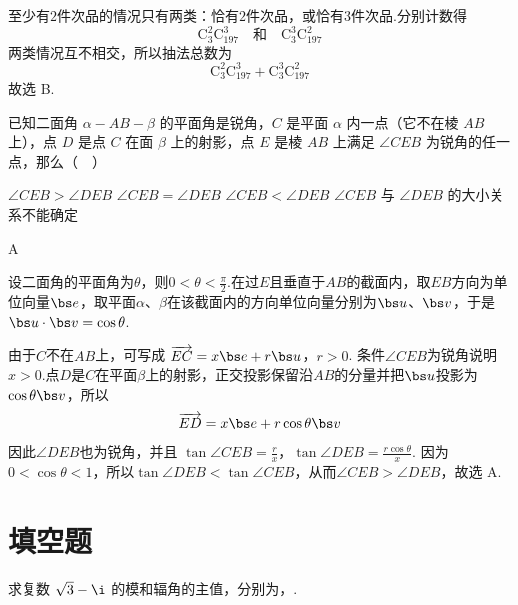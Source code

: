 \begin{solution}
至少有\(2\)件次品的情况只有两类：恰有\(2\)件次品，或恰有\(3\)件次品.分别计数得
\[
\mathrm C_3^2\mathrm C_{197}^3
\quad\text{和}\quad
\mathrm C_3^3\mathrm C_{197}^2
\]
两类情况互不相交，所以抽法总数为
\[
\mathrm C_3^2\mathrm C_{197}^3+\mathrm C_3^3\mathrm C_{197}^2
\]
故选 B.
\end{solution}

\begin{problem}

已知二面角 \(\alpha-AB-\beta\) 的平面角是锐角，\(C\) 是平面 \(\alpha\) 内一点（它不在棱 \(AB\) 上），点 \(D\) 是点 \(C\) 在面 \(\beta\) 上的射影，点 \(E\) 是棱 \(AB\) 上满足 \(\angle CEB\) 为锐角的任一点，那么（\(\quad\)）

\choices
    {\(\angle CEB > \angle DEB\)}
    {\(\angle CEB = \angle DEB\)}
    {\(\angle CEB < \angle DEB\)}
    {\(\angle CEB\) 与 \(\angle DEB\) 的大小关系不能确定}
\end{problem}

\begin{answer}
A
\end{answer}

\begin{solution}
设二面角的平面角为\(\theta\)，则\(0<\theta<\frac{\pi}{2}\).在过\(E\)且垂直于\(AB\)的截面内，取\(EB\)方向为单位向量\(\bs e\)，取平面\(\alpha\)、\(\beta\)在该截面内的方向单位向量分别为\(\bs u\)、\(\bs v\)，于是\(\bs u\cdot\bs v=\cos\theta\).

由于\(C\)不在\(AB\)上，可写成
\(\overrightarrow{EC}=x\bs e+r\bs u\)，\(r>0\).
条件\(\angle CEB\)为锐角说明\(x>0\).点\(D\)是\(C\)在平面\(\beta\)上的射影，正交投影保留沿\(AB\)的分量并把\(\bs u\)投影为\(\cos\theta\bs v\)，所以
\[
\overrightarrow{ED}=x\bs e+r\cos\theta\bs v
\]
因此\(\angle DEB\)也为锐角，并且
\(\tan\angle CEB=\frac{r}{x}\)，\(\tan\angle DEB=\frac{r\cos\theta}{x}\).
因为\(0<\cos\theta<1\)，所以\(\tan\angle DEB<\tan\angle CEB\)，从而\(\angle CEB>\angle DEB\)，故选 A.
\end{solution}

\section{填空题}

\begin{problem}

求复数 \(\sqrt{3} - \i\) 的模和辐角的主值，分别为\fillinblank{}，\fillinblank{}.
\end{problem}

